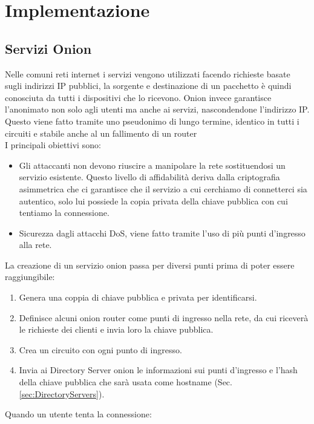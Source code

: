 \chapter{Implementazione}

\section{Servizi Onion}
Nelle comuni reti internet i servizi vengono utilizzati facendo richieste basate sugli indirizzi IP pubblici, la sorgente e destinazione di un pacchetto è quindi conosciuta da tutti i dispositivi che lo ricevono. 
Onion invece garantisce l'anonimato non solo agli utenti ma anche ai servizi, nascondendone l'indirizzo IP. 
Questo viene fatto tramite uno pseudonimo di lungo termine, identico in tutti i circuiti e stabile anche al un fallimento di un router \\
I principali obiettivi sono:
\begin{itemize}
    \item Gli attaccanti non devono riuscire a manipolare la rete sostituendosi un servizio esistente. Questo livello di affidabilità deriva dalla criptografia asimmetrica che ci garantisce che il servizio a cui cerchiamo di connetterci sia autentico, solo lui possiede la copia privata della chiave pubblica con cui tentiamo la connessione.
    \item Sicurezza dagli attacchi DoS, viene fatto tramite l'uso di più punti d'ingresso alla rete.
\end{itemize}
La creazione di un servizio onion passa per diversi punti prima di poter essere raggiungibile:
\begin{enumerate}
    \item Genera una coppia di chiave pubblica e privata per identificarsi.
    \item Definisce alcuni onion router come punti di ingresso nella rete, da cui riceverà le richieste dei clienti e invia loro la chiave pubblica.
    \item Crea un circuito con ogni punto di ingresso.
    \item Invia ai Directory Server onion le informazioni sui punti d'ingresso e l'hash della chiave pubblica che sarà usata come hostname (Sec. \ref{sec:DirectoryServers}).
\end{enumerate}
Quando un utente tenta la connessione:
